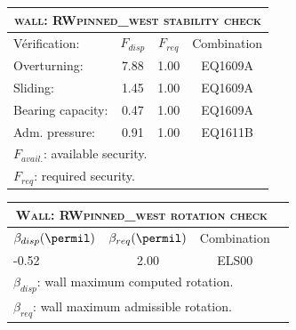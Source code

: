 \begin{center}
\begin{tabular}[H]{|l|c|c|c|}
\hline
\multicolumn{4}{|c|}{\textsc{wall: RWpinned_west stability check}}\\
\hline
Vérification:  & $F_{disp}$ & $F_{req}$ & Combination\\
\hline
Overturning:  & 7.88 & 1.00 & EQ1609A\\
Sliding:  & 1.45 & 1.00 & EQ1609A\\
Bearing capacity:  & 0.47 & 1.00 & EQ1609A\\
Adm. pressure:  & 0.91 & 1.00 & EQ1611B\\
\hline
\multicolumn{4}{|l|}{$F_{avail.}$: available security.}\\
\multicolumn{4}{|l|}{$F_{req}$: required security.}\\
\hline
\end{tabular}
\end{center}
\begin{center}
\begin{tabular}[H]{|l|c|c|c|}
\hline
\multicolumn{3}{|c|}{\textsc{Wall: RWpinned_west rotation check}}\\
\hline
$\beta_{disp} (\permil)$ & $\beta_{req}(\permil)$ & Combination\\
\hline
-0.52 & 2.00 & ELS00\\
\hline
\multicolumn{3}{|l|}{$\beta_{disp}$: wall maximum computed rotation.}\\
\multicolumn{3}{|l|}{$\beta_{req}$: wall maximum admissible rotation.}\\
\hline
\end{tabular}
\end{center}
 \label{tb_RWpinned_west}
\tablelasttail{\hline}
